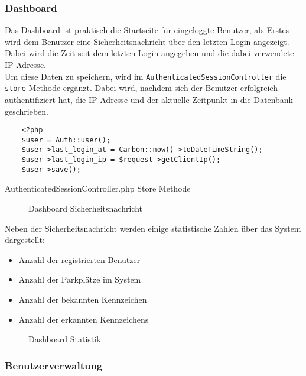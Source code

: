 
\subsubsection{Dashboard}
Das Dashboard ist praktisch die Startseite für eingeloggte Benutzer, als Erstes
wird dem Benutzer eine Sicherheitsnachricht über den letzten Login angezeigt.
Dabei wird die Zeit seit dem letzten Login angegeben und die dabei verwendete
IP-Adresse.\\

Um diese Daten zu speichern, wird im \verb|AuthenticatedSessionController| die
\verb|store| Methode ergänzt. Dabei wird, nachdem sich der Benutzer erfolgreich
authentifiziert hat, die IP-Adresse und der aktuelle Zeitpunkt in die Datenbank
geschrieben.

\begin{listing}[H]
  \begin{verbatim}
    <?php
    $user = Auth::user();
    $user->last_login_at = Carbon::now()->toDateTimeString();
    $user->last_login_ip = $request->getClientIp();
    $user->save();
  \end{verbatim}
  \caption{AuthenticatedSessionController.php Store Methode}
\end{listing}

\begin{figure}[H]
  \centering
  \caption{Dashboard Sicherheitsnachricht}
\end{figure}

Neben der Sicherheitsnachricht werden einige statistische Zahlen über das System
dargestellt:

\begin{itemize}
  \item Anzahl der registrierten Benutzer
  \item Anzahl der Parkplätze im System
  \item Anzahl der bekannten Kennzeichen
  \item Anzahl der erkannten Kennzeichens
\end{itemize}

\begin{figure}[H]
  \centering
  \caption{Dashboard Statistik}
\end{figure}

\subsubsection{Benutzerverwaltung}


